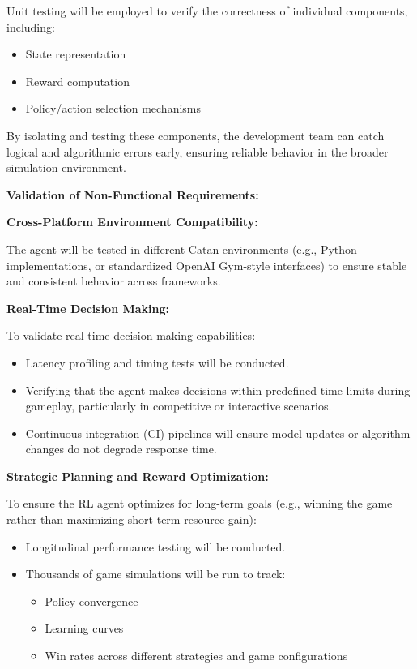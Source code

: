 \documentclass{article}
\begin{document}
Unit testing will be employed to verify the correctness of individual components, including:
\begin{itemize}
    \item State representation
    \item Reward computation
    \item Policy/action selection mechanisms
\end{itemize}

By isolating and testing these components, the development team can catch logical and algorithmic errors early, ensuring reliable behavior in the broader simulation environment.

\noindent\textbf{Validation of Non-Functional Requirements:}

\noindent\textbf{Cross-Platform Environment Compatibility:}

The agent will be tested in different Catan environments (e.g., Python implementations, or standardized OpenAI Gym-style interfaces) to ensure stable and consistent behavior across frameworks.

\noindent\textbf{Real-Time Decision Making:}

To validate real-time decision-making capabilities:
\begin{itemize}
    \item Latency profiling and timing tests will be conducted.
    \item Verifying that the agent makes decisions within predefined time limits during gameplay, particularly in competitive or interactive scenarios.
    \item Continuous integration (CI) pipelines will ensure model updates or algorithm changes do not degrade response time.
\end{itemize}

\noindent\textbf{Strategic Planning and Reward Optimization:}

To ensure the RL agent optimizes for long-term goals (e.g., winning the game rather than maximizing short-term resource gain):
\begin{itemize}
    \item Longitudinal performance testing will be conducted.
    \item Thousands of game simulations will be run to track:
    \begin{itemize}
        \item Policy convergence
        \item Learning curves
        \item Win rates across different strategies and game configurations
    \end{itemize}
\end{itemize}
\end{document}
